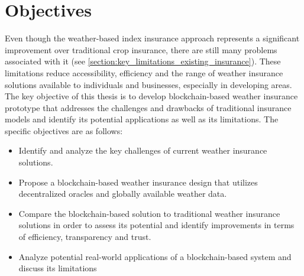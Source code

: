 \section{Objectives}\label{section:objectives}
Even though the weather-based index insurance approach represents a significant improvement over traditional crop insurance, there are still many problems associated with it (see \cref{section:key_limitations_existing_insurance}). These limitations reduce accessibility, efficiency and the range of weather insurance solutions available to individuals and businesses, especially in developing areas. The key objective of this thesis is to develop blockchain-based weather insurance prototype that addresses the challenges and drawbacks of traditional insurance models and identify its potential applications as well as its limitations. The specific objectives are as follows:

\begin{itemize}
    \item Identify and analyze the key challenges of current weather insurance solutions.
    \item Propose a blockchain-based weather insurance design that utilizes decentralized oracles and globally available weather data.
    \item Compare the blockchain-based solution to traditional weather insurance solutions in order to assess its potential and identify improvements in terms of efficiency, transparency and trust.
    \item Analyze potential real-world applications of a blockchain-based system and discuss its limitations
\end{itemize}
